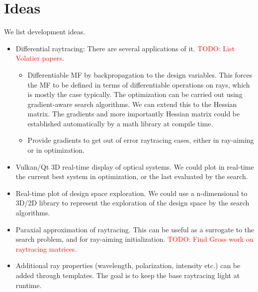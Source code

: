 \section{Ideas}
We list development ideas.

\begin{itemize}
\item Differential raytracing: There are several applications of it.
      \textcolor{red}{TODO: List Volatier papers}.
\begin{itemize}
  \item Differentiable MF by backpropagation to the design variables. This
        forces the MF to be defined in terms of differentiable operations on
        rays, which is mostly the case typically. The optimization can be
        carried out using gradient-aware search algorithms. We can extend this
        to the Hessian matrix. The gradients and more importantly Hessian matrix
        could be established automatically by a math library at compile time.
  \item Provide gradients to get out of error raytracing cases, either in
        ray-aiming or in optimization.
\end{itemize}
\item Vulkan/Qt 3D real-time display of optical systems. We could plot in
      real-time the current best system in optimization, or the last evaluated
      by the search.
\item Real-time plot of design space exploration. We could use a n-dimensional
      to 3D/2D library to represent the exploration of the design space by the
      search algorithms. 
\item Paraxial approximation of raytracing. This can be useful as a surrogate
      to the search problem, and for ray-aiming initialization.
      \textcolor{red}{TODO: Find Gross work on raytracing matrices.}
\item Additional ray properties (wavelength, polarization, intensity etc.)
      can be added through templates. The goal is to keep the base raytracing
      light at runtime.
\end{itemize}
